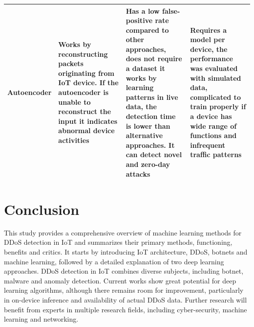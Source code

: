 \documentclass[conference, 11pt]{IEEEtran}
\begin{document}
\begin{table}[htbp]
\begin{center}
\begin{tabularx}{\linewidth}{|l|X|X|X|}
                \hline
                Autoencoder \cite{article:4}                                        & Works by reconstructing packets originating from IoT device. If the autoencoder is unable to reconstruct the input it indicates abnormal device activities & Has a low false-positive rate compared to other approaches, does not require a dataset it works by learning patterns in live data, the detection time is lower than alternative approaches. It can detect novel and zero-day attacks    & Requires a model per device, the performance was evaluated with simulated data, complicated to train properly if a device has wide range of functions and infrequent traffic patterns                      \\
                \hline
            \end{tabularx}
            \label{tab1}
        \end{center}
    \end{table}


    \section{Conclusion}
    This study provides a comprehensive overview of machine learning methods for DDoS detection in IoT and summarizes their primary methods, functioning, benefits and critics.
    It starts by introducing IoT architecture, DDoS, botnets and machine learning, followed by a detailed explanation of two deep learning approaches.
    DDoS detection in IoT combines diverse subjects, including botnet, malware and anomaly detection.
    Current works show great potential for deep learning algorithms, although there remains room for improvement, particularly in on-device inference and availability of actual DDoS data.
    Further research will benefit from experts in multiple research fields, including cyber-security, machine learning and networking.


    
    
\end{document}

